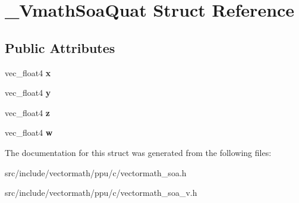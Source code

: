 \hypertarget{struct__VmathSoaQuat}{\section{\-\_\-\-Vmath\-Soa\-Quat Struct Reference}
\label{struct__VmathSoaQuat}
}
\subsection*{Public Attributes}
\begin{DoxyCompactItemize}
\item 
\hypertarget{struct__VmathSoaQuat_aa712262467c9ed091907fa59449ea8b1}{vec\-\_\-float4 {\bfseries x}}\label{struct__VmathSoaQuat_aa712262467c9ed091907fa59449ea8b1}

\item 
\hypertarget{struct__VmathSoaQuat_a79f5d0c8023e5e717a55f9ec2d850974}{vec\-\_\-float4 {\bfseries y}}\label{struct__VmathSoaQuat_a79f5d0c8023e5e717a55f9ec2d850974}

\item 
\hypertarget{struct__VmathSoaQuat_a5357809e4b152dac8759b46d8ccd3dbf}{vec\-\_\-float4 {\bfseries z}}\label{struct__VmathSoaQuat_a5357809e4b152dac8759b46d8ccd3dbf}

\item 
\hypertarget{struct__VmathSoaQuat_a3dab6ee991f837ae25c81826caf4a115}{vec\-\_\-float4 {\bfseries w}}\label{struct__VmathSoaQuat_a3dab6ee991f837ae25c81826caf4a115}

\end{DoxyCompactItemize}


The documentation for this struct was generated from the following files\-:\begin{DoxyCompactItemize}
\item 
src/include/vectormath/ppu/c/vectormath\-\_\-soa.\-h\item 
src/include/vectormath/ppu/c/vectormath\-\_\-soa\-\_\-v.\-h\end{DoxyCompactItemize}
